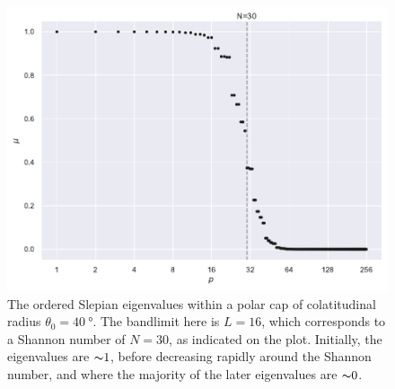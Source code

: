 \begin{figure}[htpb]
	\centering\capstart{}
	\includegraphics[width=\textwidth]{polar_cap_eigenvalues.pdf}
	\caption[
		The Slepian eigenvalues within a \(\SI{40}{\degree}\) polar cap
	]{
		The ordered Slepian eigenvalues within a polar cap of colatitudinal radius \(\theta_{0}=\SI{40}{\degree}\).
		The bandlimit here is \(L=16\), which corresponds to a Shannon number of \(N=30\), as indicated on the plot.
		Initially, the eigenvalues are \({\thicksim}1\), before decreasing rapidly around the Shannon number, and where the majority of the later eigenvalues are \({\thicksim}0\).
	}\label{fig:chapter2_polar_cap_eigenvalues}
\end{figure}
